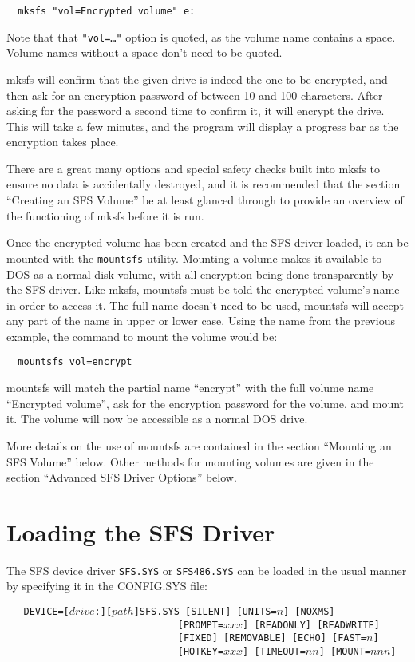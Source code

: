 {\tt \verb|  |mksfs "vol=Encrypted volume" e:}

Note that that {\tt "vol=\dots"} option is quoted, as the volume name contains a space.
Volume names without a space don't need to be quoted.

mksfs will confirm that the given drive is indeed the one to be encrypted, and
then ask for an encryption password of between 10 and 100 characters.  After
asking for the password a second time to confirm it, it will encrypt the drive.
This will take a few minutes, and the program will display a progress bar as
the encryption takes place.

There are a great many options and special safety checks built into mksfs to
ensure no data is accidentally destroyed, and it is recommended that the
section ``Creating an SFS Volume'' be at least glanced through to provide an
overview of the functioning of mksfs before it is run.

Once the encrypted volume has been created and the SFS driver loaded, it can be 
mounted with the {\tt mountsfs} utility.  Mounting a volume makes it available 
to DOS as a normal
disk volume, with all encryption being done transparently by the SFS driver.
Like mksfs, mountsfs must be told the encrypted volume's name in order to
access it.  The full name doesn't need to be used, mountsfs will accept any
part of the name in upper or lower case.  Using the name from the previous
example, the command to mount the volume would be:

{\tt \verb|  |mountsfs vol=encrypt}

mountsfs will match the partial name ``encrypt'' with the full volume name
``Encrypted volume'', ask for the encryption password for the volume, and mount
it.  The volume will now be accessible as a normal DOS drive.

More details on the use of mountsfs are contained in the section ``Mounting an
SFS Volume'' below.  Other methods for mounting volumes are given in the section
``Advanced SFS Driver Options'' below.


\section{Loading the SFS Driver}

The SFS device driver {\tt SFS.SYS} or {\tt SFS486.SYS} can be loaded in the usual manner
by specifying it in the CONFIG.SYS file:

{\tt
\verb|  |DEVICE=[$drive$:][$path$]SFS.SYS [SILENT] [UNITS=$n$] [NOXMS]\\
\verb|                              |[PROMPT=$xxx$] [READONLY] [READWRITE]\\
\verb|                              |[FIXED] [REMOVABLE] [ECHO] [FAST=$n$]\\
\verb|                              |[HOTKEY=$xxx$] [TIMEOUT=$nn$] [MOUNT=$nnn$]}


